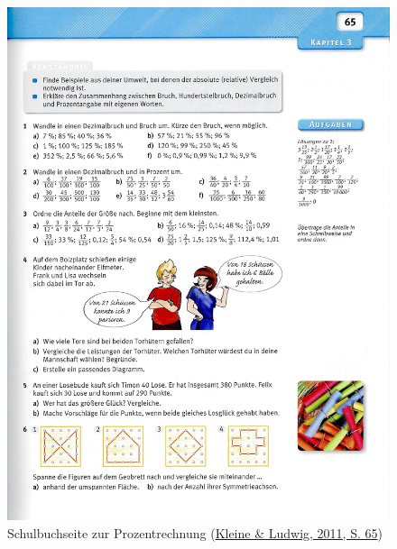 \documentclass[
  ngerman,
]{scrbook}
\theoremstyle{definition}
\theoremstyle{definition}
\theoremstyle{definition}
\theoremstyle{definition}
\theoremstyle{remark}
\begin{document}
\begin{figure}

{\centering \includegraphics[width=0.75\linewidth]{pictures/10-ProzentSchulbuch} 

}

\caption{Schulbuchseite zur Prozentrechnung (\protect\hyperlink{ref-Kleine2011a}{Kleine \& Ludwig, 2011, S. 65})}\label{fig:ProzentSchulbuch}
\end{figure}
\end{document}
